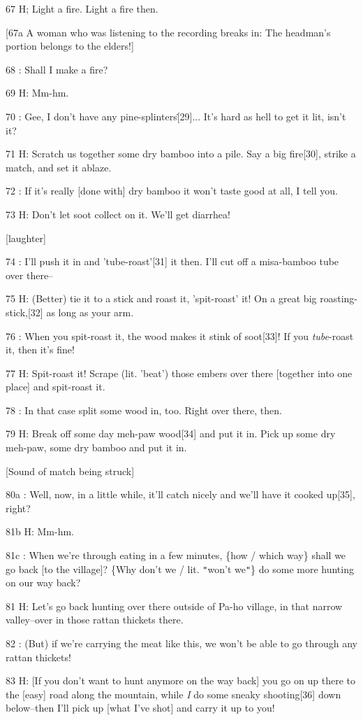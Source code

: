 67 H; Light a fire. Light a fire then.

[67a A woman who was listening to the recording breaks in: The headman's portion
belongs to the elders!]

68  : Shall I make a fire?

69 H: Mm-hm.

70  : Gee, I don't have any pine-splinters\.[29]... It's hard as hell to get it
lit, isn't it?

71 H: Scratch us together some dry bamboo into a pile. Say a big fire[30], strike
a match, and set it ablaze.

72  : If it's really [done with] dry bamboo it won't taste good at all, I tell
you.

73 H: Don't let soot collect on it. We'll get diarrhea!

[laughter]

74  : I'll push it in and 'tube-roast'[31] it then. I'll cut off a misa-bamboo
tube over there--

75 H: (Better) tie it to a stick and roast it, 'spit-roast' it! On a great big
roasting-stick,[32] as long as your arm.

76  : When you spit-roast it, the wood makes it stink of soot[33]! If you \emph{tube}-roast
it, then it's fine!

77 H: Spit-roast it! Scrape (lit. 'beat') those embers over there [together into
one place] and spit-roast it.

78  : In that case split some wood in, too. Right over there, then.

79 H: Break off some day meh-paw wood[34] and put it in. Pick up some dry meh-paw,
some dry bamboo and put it in.

[Sound of match being struck]

80a  : Well, now, in a little while, it'll catch nicely and we'll have it cooked
up[35], right?

81b H: Mm-hm.

81c  : When we're through eating in a few minutes, \{how / which way\} shall we
go back [to the village]? \{Why don't we / lit. \texttt{"}won't we\texttt{"}\}
do some more hunting on our way back?

81 H: Let's go back hunting over there outside of Pa-ho village, in that narrow
valley--over in those rattan thickets there.

82  : (But) if we're carrying the meat like this, we won't be able to go through
any rattan thickets!

83 H: [If you don't want to hunt anymore on the way back] you go on up there to
the [easy] road along the mountain, while \textit{I} do some sneaky shooting[36]
down below--then I'll pick up [what I've shot] and carry it up to you!

